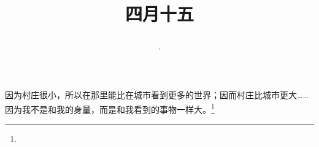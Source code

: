 \title{\date[d=22,m=5,y=2024][year:cn-y,年,month:cn,day:cn,日,·,weekday]·四月十五 }
因为村庄很小，所以在那里能比在城市看到更多的世界；因而村庄比城市更大……因为我不是和我的身量，而是和我看到的事物一样大。\footnote{ }

